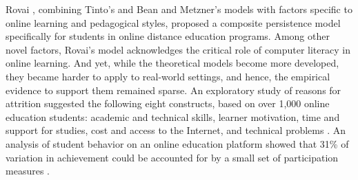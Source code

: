 \documentclass{sigchi}\usepackage[]{graphicx}\usepackage[]{color}
\begin{document}
Rovai \citeyear{rovai2003search}, combining Tinto's and Bean and Metzner's models with factors specific to online learning and pedagogical styles, proposed a composite persistence model specifically for students in online distance education programs. Among other novel factors, Rovai's model acknowledges the critical role of computer literacy in online learning. And yet, while the theoretical models become more developed, they became harder to apply to real-world settings, and hence, the empirical evidence to support them remained sparse. An exploratory study of reasons for attrition suggested the following eight constructs, based on over 1,000 online education students: academic and technical skills, learner motivation, time and support for studies, cost and access to the Internet, and technical problems \cite{muilenburg2005student}. An analysis of student behavior on an online education platform showed that 31\% of variation in achievement could be accounted for by a small set of participation measures \cite{morris2005tracking}.
\end{document}
